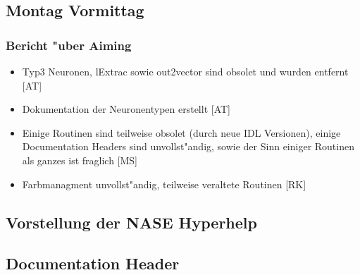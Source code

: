\documentclass[12pt]{article}
\begin{document}
\subsection{Montag Vormittag}

\subsubsection{Bericht "uber Aiming}
\begin{itemize}
\item Typ3 Neuronen, lExtrac sowie out2vector sind obsolet und wurden entfernt [AT]
\item Dokumentation der Neuronentypen erstellt [AT]
\item Einige Routinen sind teilweise obsolet (durch neue IDL Versionen), einige Documentation Headers sind unvollst"andig, sowie der Sinn einiger Routinen als ganzes ist fraglich [MS]
\item Farbmanagment unvollst"andig, teilweise veraltete Routinen [RK]
\end{itemize}

\subsection{Vorstellung der NASE Hyperhelp}

\subsection{Documentation Header}



%
% 
\end{document}
